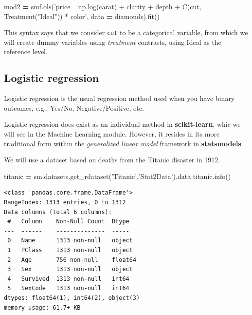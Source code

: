 \documentclass[
  letterpaper,
]{scrbook}
\newenvironment{Shaded}{\begin{snugshade}}{\end{snugshade}}
\newcommand{\NormalTok}[1]{#1}
\newcommand{\OperatorTok}[1]{\textcolor[rgb]{0.81,0.36,0.00}{\textbf{#1}}}
\newcommand{\StringTok}[1]{\textcolor[rgb]{0.31,0.60,0.02}{#1}}
\begin{document}
\begin{Shaded}
\begin{Highlighting}[]
\NormalTok{mod2 }\OperatorTok{=}\NormalTok{ smf.ols(}\StringTok{'price ~ np.log(carat) + clarity + depth + C(cut, Treatment("Ideal")) * color'}\NormalTok{, data }\OperatorTok{=}\NormalTok{ diamonds).fit()}
\end{Highlighting}
\end{Shaded}

This syntax says that we consider \texttt{cut} to be a categorical variable,
from which we will create dummy variables using \emph{treatment} contrasts,
using Ideal as the reference level.

\hypertarget{logistic-regression}{%
\subsection{Logistic regression}\label{logistic-regression}}

Logistic regression is the usual regression method used when you have
binary outcomes, e.g., Yes/No, Negative/Positive, etc.

Logistic regression does exist as an individual method in \textbf{scikit-learn}, whic we will see in the Machine Learning module. However, it resides in its more traditional form within the \emph{generalized linear model} framework in \textbf{statsmodels}

We will use a dataset based on deaths from the Titanic disaster in 1912.

\begin{Shaded}
\begin{Highlighting}[]
\NormalTok{titanic }\OperatorTok{=}\NormalTok{ sm.datasets.get_rdataset(}\StringTok{'Titanic'}\NormalTok{,}\StringTok{'Stat2Data'}\NormalTok{).data}
\NormalTok{titanic.info()}
\end{Highlighting}
\end{Shaded}

\begin{verbatim}
<class 'pandas.core.frame.DataFrame'>
RangeIndex: 1313 entries, 0 to 1312
Data columns (total 6 columns):
 #   Column    Non-Null Count  Dtype  
---  ------    --------------  -----  
 0   Name      1313 non-null   object 
 1   PClass    1313 non-null   object 
 2   Age       756 non-null    float64
 3   Sex       1313 non-null   object 
 4   Survived  1313 non-null   int64  
 5   SexCode   1313 non-null   int64  
dtypes: float64(1), int64(2), object(3)
memory usage: 61.7+ KB
\end{verbatim}
\end{document}
